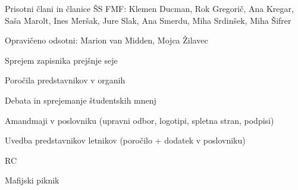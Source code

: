 \documentclass{seja}
\begin{document}
Prisotni člani in članice ŠS FMF: Klemen Ducman, Rok Gregorič, Ana Kregar, Saša Marolt, Ines Meršak, Jure Slak, Ana Smerdu, Miha Srdinšek, Miha Šifrer

Opravičeno odsotni: Marion van Midden, Mojca Žilavec

\begin{red*}
\item Sprejem zapisnika prejšnje seje
\item Poročila predstavnikov v organih
\item Debata in sprejemanje študentskih mnenj
\item Amandmaji v poslovniku (upravni odbor, logotipi, spletna stran, podpisi)
\item Uvedba predstavnikov letnikov (poročilo + dodatek v poslovniku)
\item RC
\item Mafijski piknik
\end{red*}
\end{document}
